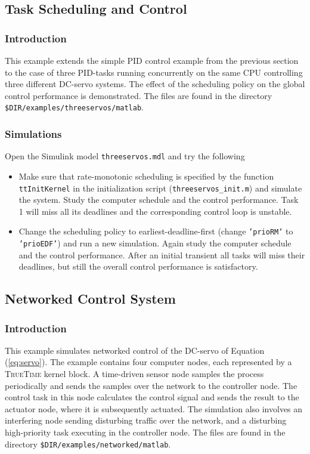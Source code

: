 \documentclass[final,twoside]{rapport}
\begin{document}
\subsection{Task Scheduling and Control}

\subsubsection{Introduction}
This example extends the simple PID control example from the previous
section to the case of three PID-tasks running concurrently on the
same CPU controlling three different DC-servo systems. The effect of
the scheduling policy on the global control performance is
demonstrated. The files are found in the directory
\texttt{\$DIR/examples/threeservos/matlab}.

\subsubsection{Simulations}
Open the Simulink model \texttt{threeservos.mdl} and try the following

\begin{itemize}
\item Make sure that rate-monotonic scheduling is specified by the
  function \linebreak \texttt{ttInitKernel} in the initialization script
  (\texttt{threeservos\_init.m}) and simulate the system. Study the
  computer schedule and the control performance. Task 1 will miss all
  its deadlines and the corresponding control loop is unstable.
\item Change the scheduling policy to earliest-deadline-first (change
  \texttt{'prioRM'} to \texttt{'prioEDF'}) and run a new simulation.
  Again study the computer schedule and the control performance. After
  an initial transient all tasks will miss their deadlines, but still the
  overall control performance is satisfactory.
\end{itemize} 

\subsection{Networked Control System}
\label{sec:dist}

\subsubsection{Introduction}
This example simulates networked control of the DC-servo
of Equation (\ref{eq:servo}). The example contains four computer
nodes, each represented by a \textsc{TrueTime} kernel block. A
time-driven sensor node samples the process periodically and sends the
samples over the network to the controller node. The control task in
this node calculates the control signal and sends the result to the
actuator node, where it is subsequently actuated. The simulation also
involves an interfering node sending disturbing traffic over the
network, and a disturbing high-priority task executing in the
controller node. The files are found in the directory
\texttt{\$DIR/examples/networked/matlab}.
\end{document}
